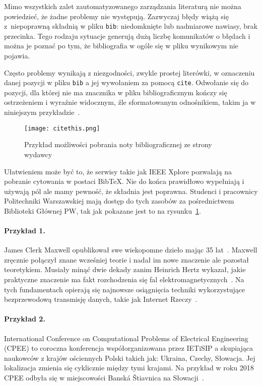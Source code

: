 Mimo wszystkich zalet zautomatyzowanego zarządzania literaturą nie można powiedzieć, że żadne problemy nie występują. Zazwyczaj błędy wiążą się z~niepoprawną składnią w pliku \texttt{bib}: niedomknięte lub nadmiarowe nawiasy, brak przecinka. Tego rodzaju sytuacje generują dużą liczbę komunikatów o błędach i można je poznać po tym, że bibliografia w ogóle się w pliku wynikowym nie pojawia.

Często problemy wynikają z niezgodności, zwykle prostej literówki, w oznaczeniu danej pozycji w pliku \texttt{bib} a jej wywołaniem za pomocą \texttt{cite}. Odwołanie się do pozycji, dla której nie ma znacznika w pliku bibliograficznym kończy się ostrzeżeniem i wyraźnie widocznym, źle sformatowanym odnośnikiem, takim ja w niniejszym przykładzie~\cite{tegoniema}.

\begin{figure}[t]
	\centering \texttt{[image: citethis.png]}
	\caption{Przykład możliwości pobrania noty bibliograficznej ze strony wydawcy}
	\label{rys:citethis}
\end{figure}

Ułatwieniem może być to, że serwisy takie jak IEEE Xplore pozwalają na pobranie cytowania w postaci BibTeX. Nie do końca prawidłowo wypełniają i używają pól ale mamy pewność, że składnia jest poprawna. Studenci i pracownicy Politechniki Warszawskiej mają dostęp do tych zasobów za pośrednictwem Biblioteki Głównej PW, tak jak pokazane jest to na rysunku~\ref{rys:citethis}.

\paragraph{Przykład 1.}
James Clerk Maxwell opublikował swe wiekopomne dzieło mając 35 lat~\cite{maxwell1865}. Maxwell zręcznie połączył znane wcześniej teorie i nadał im nowe znaczenie ale pozostał teoretykiem. Musiały minąć dwie dekady zanim Heinrich Hertz wykazał, jakie praktyczne znaczenie ma fakt rozchodzenia się fal elektromagnetycznych~\cite{cichon1995}. Na tych fundamentach opierają się najnowsze osiągnięcia techniki wykorzystujące bezprzewodową transmisję danych, takie jak Internet Rzeczy~\cite{lncsevo}.

\paragraph{Przykład 2.} International Conference on Computational Problems of Electrical Engineering (CPEE) to coroczna konferencja współorganizowana przez IETiSIP a skupiająca naukowców z krajów ościennych Polski takich jak: Ukraina, Czechy, Słowacja. Jej lokalizacja zmienia się cyklicznie między tymi krajami. Na przykład w roku 2018 CPEE odbyła się w miejscowości Banská Štiavnica na Słowacji~\cite{cpee2018}.

